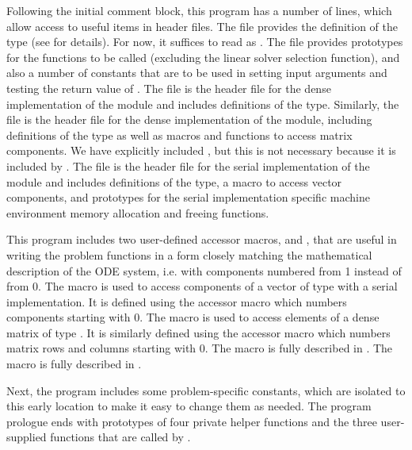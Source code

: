 Following the initial comment block, this program has a number
of  lines, which allow access to useful items in {\cvode}
header files.  The  file provides the definition of the
type  (see  for details).  
For now, it suffices to read  as .
The  file provides prototypes for the {\cvode}
functions to be called (excluding the linear solver selection
function), and also a number of constants that are to be used in
setting input arguments and testing the return value of .
The 
file is the header file for the dense implementation of the
{\sunlinsol} module and includes definitions of the
 type.  Similarly, the 
file is the header file for the dense implementation of the
{\sunmatrix} module, including definitions of the  type
as well as macros and functions to access matrix components.  
We have explicitly included , but this is not
necessary because it is included by .
The  file is the header file for the serial
implementation of the {\nvector} module and includes definitions of the 
 type, a macro to access vector components, and prototypes 
for the serial implementation specific machine environment memory allocation
and freeing functions.

This program includes two user-defined accessor macros,  and
, that are useful in writing the problem functions in a form
closely matching the mathematical description of the ODE system,
i.e. with components numbered from 1 instead of from 0.  The 
macro is used to access components of a vector of type 
with a serial implementation.  It is defined using the {\nvecs}
accessor macro  which numbers components starting with
0. The  macro is used to access elements of a dense matrix of
type .  It is similarly defined using the {\sunmatdense}
accessor macro  which numbers matrix rows and
columns starting with 
0. 
The macro  is fully described in .
The macro  is fully described in .

Next, the program includes some problem-specific constants, which are
isolated to this early location to make it easy to change them as needed.  
The program prologue ends with prototypes of four private helper
functions and the three user-supplied functions that are called by {\cvode}.

